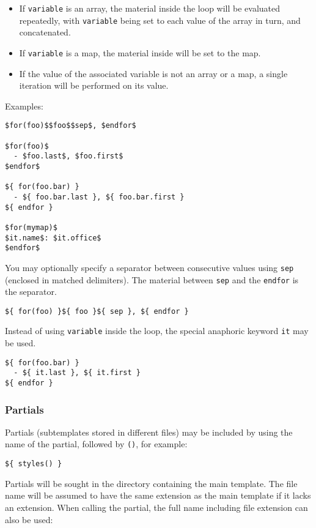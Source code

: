 \documentclass[
]{article}
\providecommand{\tightlist}{%
  \setlength{\itemsep}{0pt}\setlength{\parskip}{0pt}}
\begin{document}
\begin{itemize}
\tightlist
\item
  If \texttt{variable} is an array, the material inside the loop will be
  evaluated repeatedly, with \texttt{variable} being set to each value
  of the array in turn, and concatenated.
\item
  If \texttt{variable} is a map, the material inside will be set to the
  map.
\item
  If the value of the associated variable is not an array or a map, a
  single iteration will be performed on its value.
\end{itemize}

Examples:

\begin{verbatim}
$for(foo)$$foo$$sep$, $endfor$

$for(foo)$
  - $foo.last$, $foo.first$
$endfor$

${ for(foo.bar) }
  - ${ foo.bar.last }, ${ foo.bar.first }
${ endfor }

$for(mymap)$
$it.name$: $it.office$
$endfor$
\end{verbatim}

You may optionally specify a separator between consecutive values using
\texttt{sep} (enclosed in matched delimiters). The material between
\texttt{sep} and the \texttt{endfor} is the separator.

\begin{verbatim}
${ for(foo) }${ foo }${ sep }, ${ endfor }
\end{verbatim}

Instead of using \texttt{variable} inside the loop, the special
anaphoric keyword \texttt{it} may be used.

\begin{verbatim}
${ for(foo.bar) }
  - ${ it.last }, ${ it.first }
${ endfor }
\end{verbatim}

\subsubsection{Partials}\label{partials}

Partials (subtemplates stored in different files) may be included by
using the name of the partial, followed by \texttt{()}, for example:

\begin{verbatim}
${ styles() }
\end{verbatim}

Partials will be sought in the directory containing the main template.
The file name will be assumed to have the same extension as the main
template if it lacks an extension. When calling the partial, the full
name including file extension can also be used:
\end{document}
